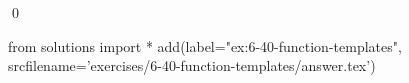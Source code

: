 
\begin{ex}
  \label{ex:6-40-function-templates}
  
  \qed
\end{ex}
\begin{python0}
from solutions import *
add(label="ex:6-40-function-templates",
    srcfilename='exercises/6-40-function-templates/answer.tex')
\end{python0}

